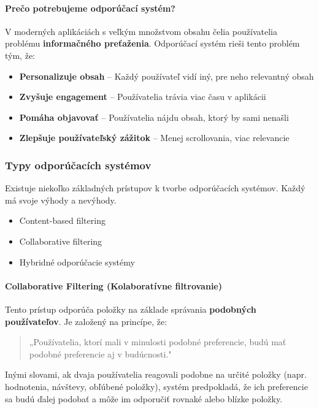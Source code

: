 \paragraph{Prečo potrebujeme odporúčací systém?}

V moderných aplikáciách s veľkým množstvom obsahu čelia používatelia problému \textbf{informačného preťaženia}. Odporúčací systém rieši tento problém tým, že:

\begin{itemize}
    \item \textbf{Personalizuje obsah} -- Každý používateľ vidí iný, pre neho relevantný obsah
    \item \textbf{Zvyšuje engagement} -- Používatelia trávia viac času v aplikácii
    \item \textbf{Pomáha objavovať} -- Používatelia nájdu obsah, ktorý by sami nenašli
    \item \textbf{Zlepšuje používateľský zážitok} -- Menej scrollovania, viac relevancie
\end{itemize}

\subsubsection{Typy odporúčacích systémov}

Existuje niekoľko základných prístupov k tvorbe odporúčacích systémov. Každý má svoje výhody a nevýhody.

\begin{itemize}
    \item Content-based filtering
    \item Collaborative filtering
    \item Hybridné odporúčacie systémy
\end{itemize}

\paragraph{Collaborative Filtering (Kolaboratívne filtrovanie)}

Tento prístup odporúča položky na základe správania \textbf{podobných používateľov}.
Je založený na princípe, že:
\begin{quote}
„Používatelia, ktorí mali v minulosti podobné preferencie, budú mať podobné preferencie aj v budúcnosti."
\end{quote}
Inými slovami, ak dvaja používatelia reagovali podobne na určité položky (napr. hodnotenia, návštevy, obľúbené položky), systém predpokladá, že ich preferencie sa budú ďalej podobať a môže im odporučiť rovnaké alebo blízke položky.

